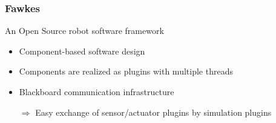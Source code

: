 \documentclass[]{beamer}
\begin{document}
\begin{frame}
  \frametitle{Fawkes}
  \begin{multicols}{2}
    \begin{figure}
    \end{figure}
    An Open Source robot software framework
    \begin{itemize}
    \item Component-based software design
    \item Components are realized as plugins with multiple threads
    \item Blackboard communication infrastructure
      \pause
    \end{itemize}
  \end{multicols}
  \begin{itemize}
  \item[$\Rightarrow$] Easy exchange of sensor/actuator plugins by simulation plugins
  \end{itemize}
\end{frame}
\end{document}
